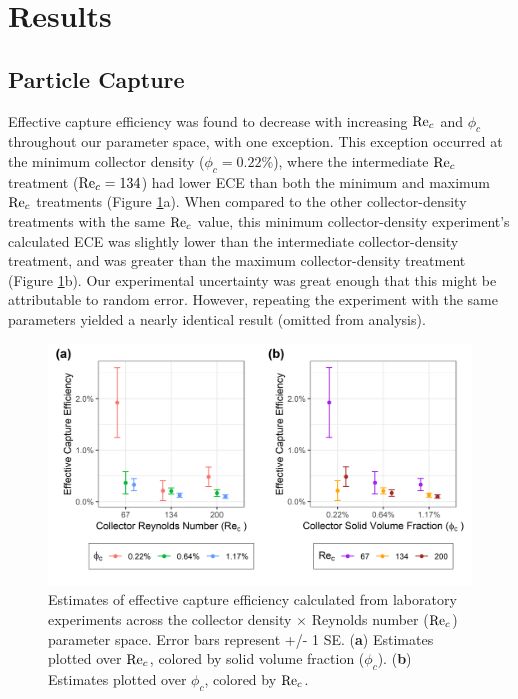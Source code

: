 \documentclass[geosciences,article,submit,moreauthors,pdftex]{Definitions/mdpi}
\begin{document}
\section{Results}

\subsection{Particle Capture}

Effective capture efficiency was found to decrease with increasing $\mathrm{Re}_c$ and $\phi_c$ throughout our parameter space, with one exception. This exception occurred at the minimum collector density ($\phi_c = 0.22\%$), where the intermediate $\mathrm{Re}_c$ treatment ($\mathrm{Re}_c = 134$) had lower ECE than both the minimum and maximum $\mathrm{Re}_c$ treatments (Figure \ref{fig:ece}a). When compared to the other collector-density treatments with the same $\mathrm{Re}_c$ value, this minimum collector-density experiment's calculated ECE was slightly lower than the intermediate collector-density treatment, and was greater than the maximum collector-density treatment (Figure \ref{fig:ece}b). Our experimental uncertainty was great enough that this might be attributable to random error. However, repeating the experiment with the same parameters yielded a nearly identical result (omitted from analysis).

\begin{figure}[H]
\centering
\includegraphics[width=5in]{../pics/ece_plot.png}
\caption{Estimates of effective capture efficiency calculated from laboratory experiments across the collector density $\times$ Reynolds number ($\mathrm{Re}_c$) parameter space. Error bars represent +/- 1 SE. (\textbf{a}) Estimates plotted over $\mathrm{Re}_c$, colored by solid volume fraction ($\phi_c$). (\textbf{b}) Estimates plotted over $\phi_c$, colored by $\mathrm{Re}_c$.}
\label{fig:ece}
\end{figure}   
\end{document}
